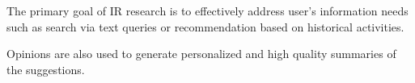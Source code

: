 The primary goal of IR research is to effectively address user's 
information needs such as search via text queries or recommendation 
based on historical activities. 


Opinions are also used to generate personalized and high 
quality summaries of the suggestions. 